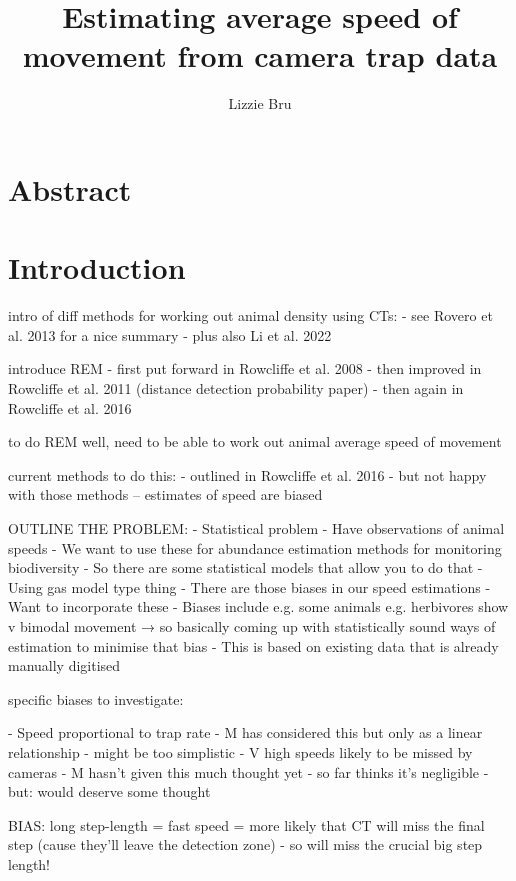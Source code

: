 \documentclass[11pt]{article}
\title{\textbf{Estimating average speed of movement from camera trap data}}
\author[1]{Lizzie Bru}
\affil[1]{School of Life Sciences, Imperial College London, Silwood Park Campus, Ascot SL5 7PY, UK}
\date{}
\begin{document}
	
	\maketitle
	
	\newpage
	
	\section{Abstract}

	
	\section{Introduction}
	
	intro of diff methods for working out animal density using CTs:
	- see Rovero et al. 2013 for a nice summary
	- plus also Li et al. 2022
	
	introduce REM
	- first put forward in Rowcliffe et al. 2008
	- then improved in Rowcliffe et al. 2011 (distance detection probability paper)
	- then again in Rowcliffe et al. 2016
	
	to do REM well, need to be able to work out animal average speed of movement
	
	current methods to do this:
	- outlined in Rowcliffe et al. 2016
	- but not happy with those methods -- estimates of speed are biased
	
	
	OUTLINE THE PROBLEM:
	- Statistical problem
	- Have observations of animal speeds
	- We want to use these for abundance estimation methods for monitoring biodiversity
	- So there are some statistical models that allow you to do that
	- Using gas model type thing
	- There are those biases in our speed estimations
	- Want to incorporate these
	- Biases include e.g. some animals e.g. herbivores show v bimodal movement
			→ so basically coming up with statistically sound ways of estimation to minimise that bias
	- This is based on existing data that is already manually digitised
	
	
	specific biases to investigate:
	
	- Speed proportional to trap rate
		- M has considered this but only as a linear relationship - might be too simplistic
	- V high speeds likely to be missed by cameras
		- M hasn’t given this much thought yet - so far thinks it’s negligible - but: would deserve some thought


	BIAS: long step-length = fast speed = more likely that CT will miss the final step (cause they’ll leave the detection zone) - so will miss the crucial big step length!
	
\end{document}
